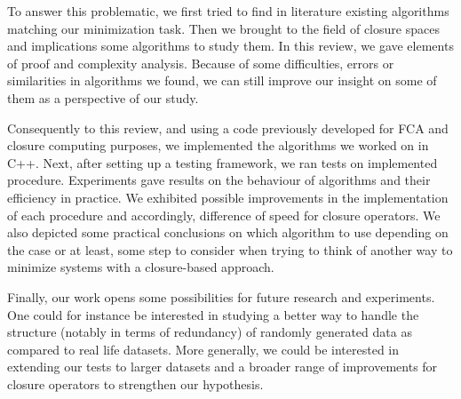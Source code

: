 \documentclass[a4paper, 10pt]{report}
\begin{document}
\vspace{1.2em}

To answer this problematic, we first tried to find in literature existing algorithms matching our minimization task. Then we brought to the field of closure spaces and implications some algorithms to study them. In this review, we gave elements of proof and complexity analysis. Because of some difficulties, errors or similarities in algorithms we found, we can still improve our insight on some of them as a perspective of our study.

\vspace{1.2em}

Consequently to this review, and using a code previously developed for FCA and closure computing purposes, we implemented the algorithms we worked on in C++. Next, after setting up a testing framework, we ran tests on implemented procedure. Experiments gave results on the behaviour of algorithms
and their efficiency in practice. We exhibited  possible improvements in the implementation of each procedure and accordingly, difference of speed
for closure operators. We also depicted some practical conclusions on which algorithm to use depending on the case or at least, some step to consider when trying to think of another way to minimize systems with a closure-based approach.

\vspace{1.2em}

Finally, our work opens some possibilities for future research and experiments. One could for instance be interested in studying a better way to handle the structure (notably in terms of redundancy) of randomly generated data as compared to real life datasets. More generally, we could be interested in extending our tests to larger datasets and a broader range of improvements for closure operators to strengthen our hypothesis.




\newpage
{}
\setcounter{page}{8}


	

\newpage
\end{document}
